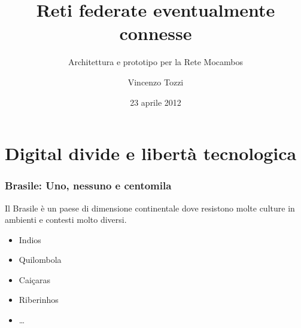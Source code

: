 \documentclass{beamer}
\title{Reti federate eventualmente connesse}
\subtitle{Architettura e prototipo per la Rete Mocambos}
\author{Vincenzo Tozzi}
\institute{Universit\`a degli Studi di Firenze - Corso di Laurea in Informatica}
\date{23 aprile 2012}
\begin{document}
{
%
\begin{frame}
  \titlepage
\end{frame}
}


\section{Digital divide e libertà tecnologica}

{

\begin{frame}

  \frametitle{Brasile: Uno, nessuno e centomila}
  Il Brasile è un paese di dimensione continentale dove resistono
  molte culture in ambienti e contesti molto diversi. 
  \begin{itemize}
  \item Indios
  \item Quilombola
  \item Caiçaras
  \item Riberinhos
  \item \ldots
  \end{itemize}

\end{frame}

}
\end{document}
